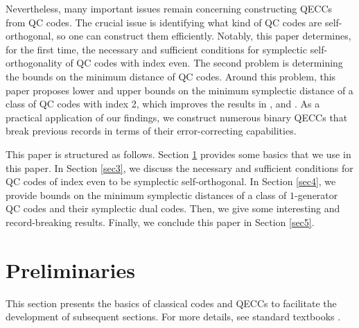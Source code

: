 \documentclass[journal]{IEEEtran}
\begin{document}
Nevertheless, many important issues remain concerning constructing QECCs from QC codes. The crucial issue is identifying what kind of QC codes are self-orthogonal, so one can construct them efficiently. 
Notably, this paper determines, for the first time, the necessary and sufficient conditions for symplectic self-orthogonality of QC codes with index even.
The second problem is determining the bounds on the minimum distance of QC codes. 
Around this problem, this paper proposes lower and upper bounds on the minimum symplectic distance of a class of QC codes with index 2, which improves the results in \cite{dastbasteh2023polynomial}, \cite{GuanAdditive2023} and \cite{galindo2018quasi}. 
As a practical application of our findings, we construct numerous binary QECCs that break previous records in terms of their error-correcting capabilities.



This paper is structured as follows. Section \ref{sec2} provides some basics that we use in this paper.
In Section \ref{sec3}, we discuss the necessary and sufficient conditions for QC codes of index even to be symplectic self-orthogonal.
In Section \ref{sec4}, we provide bounds on the minimum symplectic distances of a class of $1$-generator QC codes and their symplectic dual codes. Then, we give some interesting and record-breaking results.  
Finally, we conclude this paper in Section \ref{sec5}. 
\section{Preliminaries}\label{sec2}
This section presents the basics of classical codes and QECCs to facilitate the development of subsequent sections. For more details, see standard textbooks 
\cite{huffman2010fundamentals,huffman2021concise}.
\end{document}
